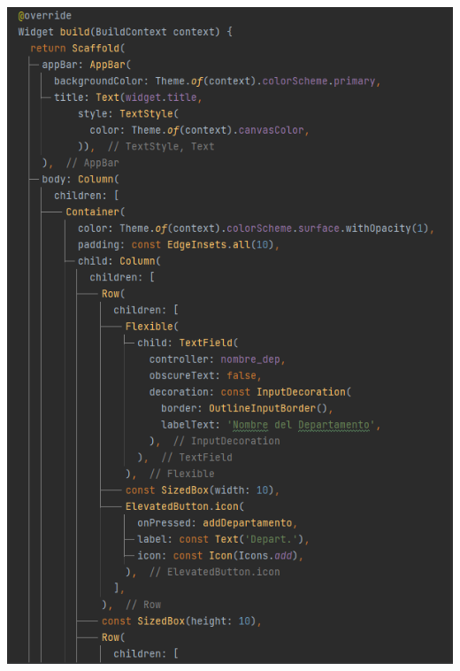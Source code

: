 \documentclass[
]{article}
\begin{document}
\includegraphics[width=5.90522in,height=8.70833in]{imagenes/main4.png}
\pagebreak
\end{document}
